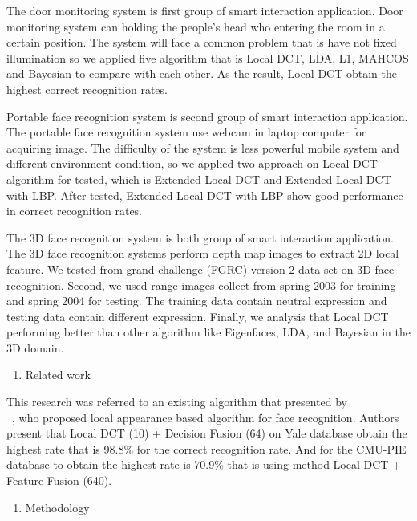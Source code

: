 \documentclass[a4paper,12pt]{article}
\begin{document}
The door monitoring system is first group of smart interaction application. 
Door monitoring system can holding the people’s head who entering the room in a certain position. The system will face a common problem that is have not fixed illumination so we applied five algorithm that is Local DCT, LDA, L1, MAHCOS and Bayesian to compare with each other. As the result, Local DCT obtain the highest correct recognition rates.

Portable face recognition system is second group of smart interaction application.  The portable face recognition system use webcam in laptop computer for acquiring image. The difficulty of the system is less powerful mobile system and different environment condition, so we applied two approach on Local DCT algorithm for tested, which is Extended Local DCT and Extended Local DCT with LBP. After tested, Extended Local DCT with LBP show good performance in correct recognition rates.

The 3D face recognition system is both group of smart interaction application. The 3D face recognition systems perform depth map images to extract 2D local feature. We tested from grand challenge (FGRC) version 2 data set on 3D face recognition. Second, we used range images collect from spring 2003 for training and spring 2004 for testing. The training data contain neutral expression and testing data contain different expression. Finally, we analysis that Local DCT performing better than other algorithm like Eigenfaces, LDA, and Bayesian in the 3D domain.\\

\begin{enumerate}[{3.}]\bfseries
\item{\normalsize Related work} 
\end{enumerate}
This research was referred to an existing algorithm that presented by \\
~\cite{ekenel2005local}, who proposed local appearance based algorithm for face recognition. Authors present that Local DCT (10) + Decision Fusion (64) on Yale database obtain the highest rate that is 98.8\% for the correct recognition rate. And for the CMU-PIE database to obtain the highest rate is 70.9\% that is using method Local DCT + Feature Fusion (640).\\

\maketitle
\begin{enumerate}[{4.}]\bfseries
\item{\normalsize Methodology} 
\end{enumerate}
\end{document}
